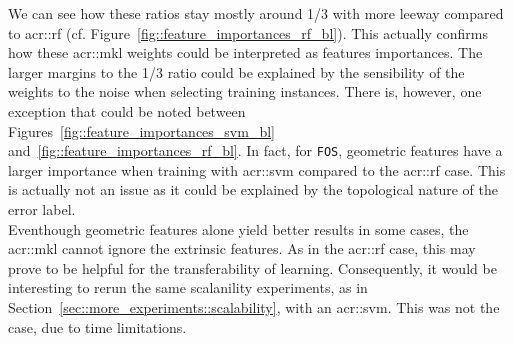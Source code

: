         We can see how these ratios stay mostly around \num[fraction-function = \sfrac]{1/3} with more leeway compared to \gls{acr::rf} (cf. Figure~\ref{fig::feature_importances_rf_bl}).
        This actually confirms how these \gls{acr::mkl} weights could be interpreted as features importances.
        The larger margins to the \num[fraction-function = \sfrac]{1/3} ratio could be explained by the sensibility of the weights to the noise when selecting training instances.
        There is, however, one exception that could be noted between Figures~\ref{fig::feature_importances_svm_bl} and~\ref{fig::feature_importances_rf_bl}.
        In fact, for \texttt{FOS}, geometric features have a larger importance when training with \gls{acr::svm} compared to the \gls{acr::rf} case.
        This is actually not an issue as it could be explained by the topological nature of the error label.\\

        Eventhough geometric features alone yield better results in some cases, the \gls{acr::mkl} cannot ignore the extrinsic features.
        As in the \gls{acr::rf} case, this may prove to be helpful for the transferability of learning.
        Consequently, it would be interesting to rerun the same scalanility experiments, as in Section~\ref{sec::more_experiments::scalability}, with an \gls{acr::svm}.
        This was not the case, due to time limitations.

